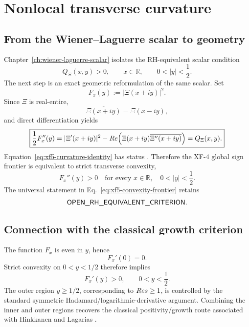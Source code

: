 \chapter{Nonlocal transverse curvature}\label{ch:nonlocal-curvature}

\section{From the Wiener--Laguerre scalar to geometry}

Chapter~\ref{ch:wiener-laguerre-scalar} isolates the RH-equivalent scalar condition
\begin{equation}\label{eq:xf5-q-frontier}
Q_\Xi(x,y)>0,
\qquad
x\in\mathbb R,
\qquad
0<|y|<\frac12.
\end{equation}
The next step is an exact geometric reformulation of the same scalar.  Set
\[
F_x(y):=|\Xi(x+iy)|^2.
\]
Since $\Xi$ is real-entire,
\[
\overline{\Xi(x+iy)}=\Xi(x-iy),
\]
and direct differentiation yields
\begin{equation}\label{eq:xf5-curvature-identity}
\boxed{
\frac12 F_x''(y)
=
|\Xi'(x+iy)|^2
-Re\!\left(
\Xi(x+iy)\overline{\Xi''(x+iy)}
\right)
=Q_\Xi(x,y).
}
\end{equation}
Equation~\eqref{eq:xf5-curvature-identity} has status .  Therefore the XF-4 global sign frontier is equivalent to strict transverse convexity,
\begin{equation}\label{eq:xf5-convexity-frontier}
\boxed{
F_x''(y)>0
\quad
\text{for every }x\in\mathbb R,
\quad0<|y|<\frac12.
}
\end{equation}
The universal statement in Eq.~\eqref{eq:xf5-convexity-frontier} retains
\[
\textsf{OPEN\_RH\_EQUIVALENT\_CRITERION}.
\]

\section{Connection with the classical growth criterion}

The function $F_x$ is even in $y$, hence
\[
F_x'(0)=0.
\]
Strict convexity on $0<y<1/2$ therefore implies
\begin{equation}\label{eq:xf5-inner-growth}
F_x'(y)>0,
\qquad 0<y<\frac12.
\end{equation}
The outer region $y\ge 1/2$, corresponding to $Re s\ge1$, is controlled by the standard symmetric Hadamard/logarithmic-derivative argument.  Combining the inner and outer regions recovers the classical positivity/growth route associated with Hinkkanen and Lagarias \cite{Lagarias1999,Planat2026Theta}.

